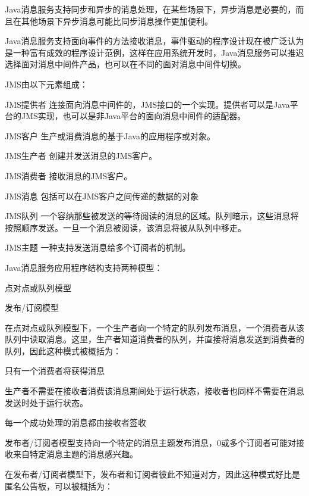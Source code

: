 Java消息服务支持同步和异步的消息处理，在某些场景下，异步消息是必要的，而且在其他场景下异步消息可能比同步消息操作更加便利。

Java消息服务支持面向事件的方法接收消息，事件驱动的程序设计现在被广泛认为是一种富有成效的程序设计范例，这样在应用系统开发时，Java消息服务可以推迟选择面对消息中间件产品，也可以在不同的面对消息中间件切换。

JMS由以下元素组成：

\begin{compactitem}
\item JMS提供者
连接面向消息中间件的，JMS接口的一个实现。提供者可以是Java平台的JMS实现，也可以是非Java平台的面向消息中间件的适配器。
\item JMS客户
生产或消费消息的基于Java的应用程序或对象。
\item JMS生产者
创建并发送消息的JMS客户。
\item JMS消费者
接收消息的JMS客户。
\item JMS消息
包括可以在JMS客户之间传递的数据的对象
\item JMS队列
一个容纳那些被发送的等待阅读的消息的区域。队列暗示，这些消息将按照顺序发送。一旦一个消息被阅读，该消息将被从队列中移走。
\item JMS主题
一种支持发送消息给多个订阅者的机制。
\end{compactitem}

Java消息服务应用程序结构支持两种模型：

\begin{compactitem}
\item 点对点或队列模型
\item 发布/订阅模型
\end{compactitem}

在点对点或队列模型下，一个生产者向一个特定的队列发布消息，一个消费者从该队列中读取消息。这里，生产者知道消费者的队列，并直接将消息发送到消费者的队列，因此这种模式被概括为：

\begin{compactitem}
\item 只有一个消费者将获得消息
\item 生产者不需要在接收者消费该消息期间处于运行状态，接收者也同样不需要在消息发送时处于运行状态。
\item 每一个成功处理的消息都由接收者签收
\end{compactitem}

发布者/订阅者模型支持向一个特定的消息主题发布消息，0或多个订阅者可能对接收来自特定消息主题的消息感兴趣。

在发布者/订阅者模型下，发布者和订阅者彼此不知道对方，因此这种模式好比是匿名公告板，可以被概括为：

